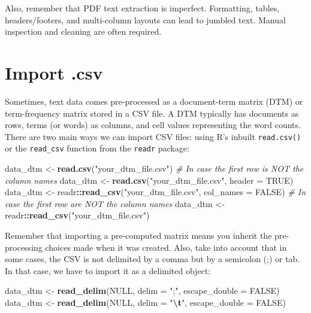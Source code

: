 \documentclass[
]{book}
\newenvironment{Shaded}{\begin{snugshade}}{\end{snugshade}}
\newcommand{\AttributeTok}[1]{\textcolor[rgb]{0.13,0.29,0.53}{#1}}
\newcommand{\CommentTok}[1]{\textcolor[rgb]{0.56,0.35,0.01}{\textit{#1}}}
\newcommand{\ConstantTok}[1]{\textcolor[rgb]{0.56,0.35,0.01}{#1}}
\newcommand{\FunctionTok}[1]{\textcolor[rgb]{0.13,0.29,0.53}{\textbf{#1}}}
\newcommand{\NormalTok}[1]{#1}
\newcommand{\OtherTok}[1]{\textcolor[rgb]{0.56,0.35,0.01}{#1}}
\newcommand{\SpecialCharTok}[1]{\textcolor[rgb]{0.81,0.36,0.00}{\textbf{#1}}}
\newcommand{\StringTok}[1]{\textcolor[rgb]{0.31,0.60,0.02}{#1}}
\begin{document}
Also, remember that PDF text extraction is imperfect. Formatting, tables, headers/footers, and multi-column layouts can lead to jumbled text. Manual inspection and cleaning are often required.

\section{Import .csv}\label{import-.csv}

Sometimes, text data comes pre-processed as a document-term matrix (DTM) or term-frequency matrix stored in a CSV file. A DTM typically has documents as rows, terms (or words) as columns, and cell values representing the word counts. There are two main ways we can import CSV files: using R's inbuilt \texttt{read.csv()} or the \texttt{read\_csv} function from the \texttt{readr} package:

\begin{Shaded}
\begin{Highlighting}[]
\NormalTok{data\_dtm }\OtherTok{\textless{}{-}} \FunctionTok{read.csv}\NormalTok{(}\StringTok{"your\_dtm\_file.csv"}\NormalTok{)  }\CommentTok{\# In case the first row is NOT the column names}
\NormalTok{data\_dtm }\OtherTok{\textless{}{-}} \FunctionTok{read.csv}\NormalTok{(}\StringTok{"your\_dtm\_file.csv"}\NormalTok{, }\AttributeTok{header =} \ConstantTok{TRUE}\NormalTok{)}
\NormalTok{data\_dtm }\OtherTok{\textless{}{-}}\NormalTok{ readr}\SpecialCharTok{::}\FunctionTok{read\_csv}\NormalTok{(}\StringTok{"your\_dtm\_file.csv"}\NormalTok{, }\AttributeTok{col\_names =} \ConstantTok{FALSE}\NormalTok{)  }\CommentTok{\# In case the first row are NOT the column names}
\NormalTok{data\_dtm }\OtherTok{\textless{}{-}}\NormalTok{ readr}\SpecialCharTok{::}\FunctionTok{read\_csv}\NormalTok{(}\StringTok{"your\_dtm\_file.csv"}\NormalTok{)}
\end{Highlighting}
\end{Shaded}

Remember that importing a pre-computed matrix means you inherit the pre-processing choices made when it was created. Also, take into account that in some cases, the CSV is not delimited by a comma but by a semicolon (;) or tab. In that case, we have to import it as a delimited object:

\begin{Shaded}
\begin{Highlighting}[]
\NormalTok{data\_dtm }\OtherTok{\textless{}{-}} \FunctionTok{read\_delim}\NormalTok{(}\ConstantTok{NULL}\NormalTok{, }\AttributeTok{delim =} \StringTok{";"}\NormalTok{, }\AttributeTok{escape\_double =} \ConstantTok{FALSE}\NormalTok{)}
\NormalTok{data\_dtm }\OtherTok{\textless{}{-}} \FunctionTok{read\_delim}\NormalTok{(}\ConstantTok{NULL}\NormalTok{, }\AttributeTok{delim =} \StringTok{"}\SpecialCharTok{\textbackslash{}t}\StringTok{"}\NormalTok{, }\AttributeTok{escape\_double =} \ConstantTok{FALSE}\NormalTok{)}
\end{Highlighting}
\end{Shaded}
\end{document}

